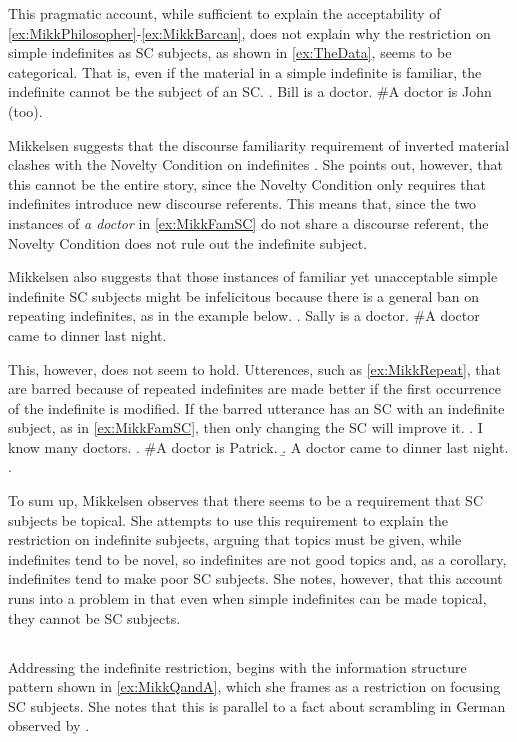 \documentclass[GPFinal]{subfiles}
\begin{document}
This pragmatic account, while sufficient to explain the acceptability of \ref{ex:MikkPhilosopher}-\ref{ex:MikkBarcan}, does not explain why the restriction on simple indefinites as SC subjects, as shown in \ref{ex:TheData}, seems to be categorical.
That is, even if the material in a simple indefinite is familiar, the indefinite cannot be the subject of an SC.
\ex.\label{ex:MikkFamSC} Bill is a doctor. \#A doctor is John (too).

Mikkelsen suggests that the discourse familiarity requirement of inverted material clashes with the Novelty Condition on indefinites \parencite{heim1982semantics}.
She points out, however, that this cannot be the entire story, since the Novelty Condition only requires that indefinites introduce new discourse referents.
This means that, since the two instances of \textit{a doctor} in \ref{ex:MikkFamSC} do not share a discourse referent, the Novelty Condition does not rule out the indefinite subject.

Mikkelsen also suggests that those instances of familiar yet unacceptable simple indefinite SC subjects might be infelicitous because there is a general ban on repeating indefinites, as in the example below.
\ex.\label{ex:MikkRepeat} Sally is a doctor. \#A doctor came to dinner last night.

This, however, does not seem to hold.
Utterences, such as \ref{ex:MikkRepeat}, that are barred because of repeated indefinites are made better if the first occurrence of the indefinite is modified.
If the barred utterance has an SC with an indefinite subject, as in \ref{ex:MikkFamSC}, then only changing the SC will improve it.
\ex. I know many doctors.
\a. \#A doctor is Patrick.
\b. A doctor came to dinner last night.
\z.

To sum up, Mikkelsen observes that there seems to be a requirement that SC subjects be topical.
She attempts to use this requirement to explain the restriction on indefinite subjects, arguing that topics must be given, while indefinites tend to be novel, so indefinites are not good topics and, as a corollary, indefinites tend to make poor SC subjects.
She notes, however, that this account runs into a problem in that even when simple indefinites can be made topical, they cannot be SC subjects.
\subsection{\textcite{heycock2012specification}}\label{sec:Heycock}
Addressing the indefinite restriction, \textcite{heycock2012specification} begins with the information structure pattern shown in \ref{ex:MikkQandA}, which she frames as a restriction on focusing SC subjects.
She notes that this is parallel to a fact about scrambling in German observed by \textcite{lenerz1977zur}.
\end{document}
